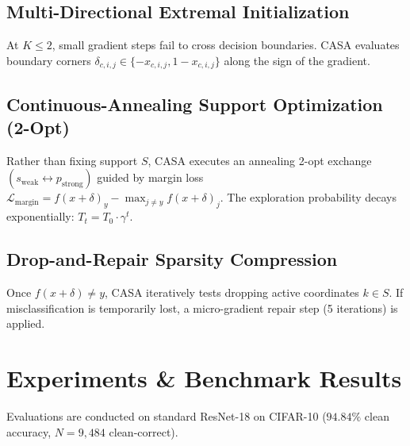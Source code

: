 \documentclass[10pt,twocolumn,letterpaper]{article}
\begin{document}
\subsection{Multi-Directional Extremal Initialization}
At $K \le 2$, small gradient steps fail to cross decision boundaries. CASA evaluates boundary corners $\delta_{c, i, j} \in \{-x_{c, i, j}, 1 - x_{c, i, j}\}$ along the sign of the gradient.

\subsection{Continuous-Annealing Support Optimization (2-Opt)}
Rather than fixing support $S$, CASA executes an annealing 2-opt exchange $(s_{\text{weak}} \leftrightarrow p_{\text{strong}})$ guided by margin loss $\mathcal{L}_{\text{margin}} = f(x + \delta)_y - \max_{j \ne y} f(x + \delta)_j$. The exploration probability decays exponentially: $T_t = T_0 \cdot \gamma^t$.

\subsection{Drop-and-Repair Sparsity Compression}
Once $f(x + \delta) \ne y$, CASA iteratively tests dropping active coordinates $k \in S$. If misclassification is temporarily lost, a micro-gradient repair step (5 iterations) is applied.

\section{Experiments \& Benchmark Results}
Evaluations are conducted on standard ResNet-18 on CIFAR-10 ($94.84\%$ clean accuracy, $N=9,484$ clean-correct).
\end{document}
